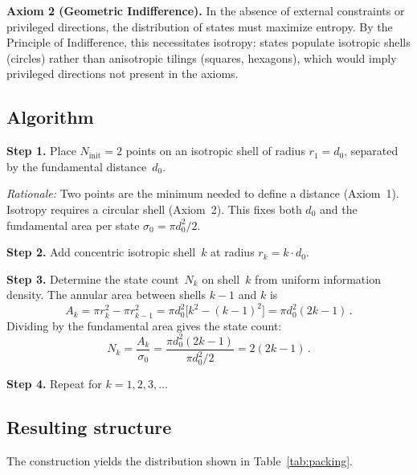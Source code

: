 \documentclass[aps,prl,reprint,amsmath,amssymb]{revtex4-2}
\begin{document}
\noindent\textbf{Axiom 2 (Geometric Indifference).}
In the absence of external constraints or privileged directions, the
distribution of states must maximize entropy.  By the Principle of
Indifference, this necessitates isotropy: states populate isotropic
shells (circles) rather than anisotropic tilings (squares, hexagons),
which would imply privileged directions not present in the axioms.

\subsection{Algorithm}

\noindent\textbf{Step 1.}  Place $N_{\mathrm{init}} = 2$ points on an
isotropic shell of radius $r_1 = d_0$, separated by the fundamental
distance~$d_0$.

\textit{Rationale:} Two points are the minimum needed to define a
distance (Axiom~1).  Isotropy requires a circular shell (Axiom~2).
This fixes both $d_0$ and the fundamental area per state
$\sigma_0 = \pi d_0^2 / 2$.

\medskip

\noindent\textbf{Step 2.}  Add concentric isotropic shell~$k$ at
radius $r_k = k \cdot d_0$.

\medskip

\noindent\textbf{Step 3.}  Determine the state count~$N_k$ on
shell~$k$ from uniform information density.  The annular area between
shells $k-1$ and $k$ is
\begin{equation}
  A_k = \pi r_k^2 - \pi r_{k-1}^2
      = \pi d_0^2 \bigl[k^2 - (k-1)^2\bigr]
      = \pi d_0^2 (2k - 1) \,.
  \label{eq:annular-area}
\end{equation}
Dividing by the fundamental area gives the state count:
\begin{equation}
  N_k = \frac{A_k}{\sigma_0}
      = \frac{\pi d_0^2 (2k-1)}{\pi d_0^2 / 2}
      = 2(2k - 1) \,.
  \label{eq:Nk}
\end{equation}

\noindent\textbf{Step 4.}  Repeat for $k = 1, 2, 3, \ldots$

\subsection{Resulting structure}

The construction yields the distribution shown in
Table~\ref{tab:packing}.
\end{document}

